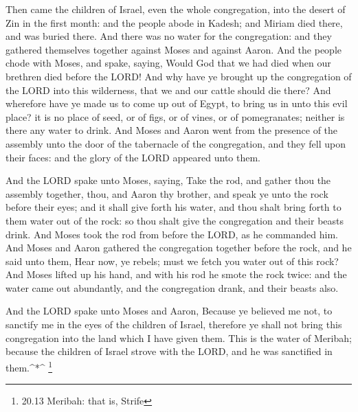  Then came the children of Israel, even the whole
congregation, into the desert of Zin in the first month: and the people
abode in Kadesh; and Miriam died there, and was buried there.
 And there was no water for the congregation: and they
gathered themselves together against Moses and against Aaron.
 And the people chode with Moses, and spake, saying, Would
God that we had died when our brethren died before the LORD!
 And why have ye brought up the congregation of the LORD
into this wilderness, that we and our cattle should die there?
 And wherefore have ye made us to come up out of Egypt, to
bring us in unto this evil place? it is no place of seed, or of figs, or
of vines, or of pomegranates; neither is there any water to drink.
 And Moses and Aaron went from the presence of the assembly
unto the door of the tabernacle of the congregation, and they fell upon
their faces: and the glory of the LORD appeared unto them.

 And the LORD spake unto Moses, saying,  Take
the rod, and gather thou the assembly together, thou, and Aaron thy
brother, and speak ye unto the rock before their eyes; and it shall give
forth his water, and thou shalt bring forth to them water out of the
rock: so thou shalt give the congregation and their beasts drink.
 And Moses took the rod from before the LORD, as he
commanded him.  And Moses and Aaron gathered the
congregation together before the rock, and he said unto them, Hear now,
ye rebels; must we fetch you water out of this rock?  And
Moses lifted up his hand, and with his rod he smote the rock twice: and
the water came out abundantly, and the congregation drank, and their
beasts also.

 And the LORD spake unto Moses and Aaron, Because ye
believed me not, to sanctify me in the eyes of the children of Israel,
therefore ye shall not bring this congregation into the land which I
have given them.  This is the water of Meribah; because the
children of Israel strove with the LORD, and he was sanctified in
them.\^{}*\^{} \footnote{20.13 Meribah: that is, Strife}

